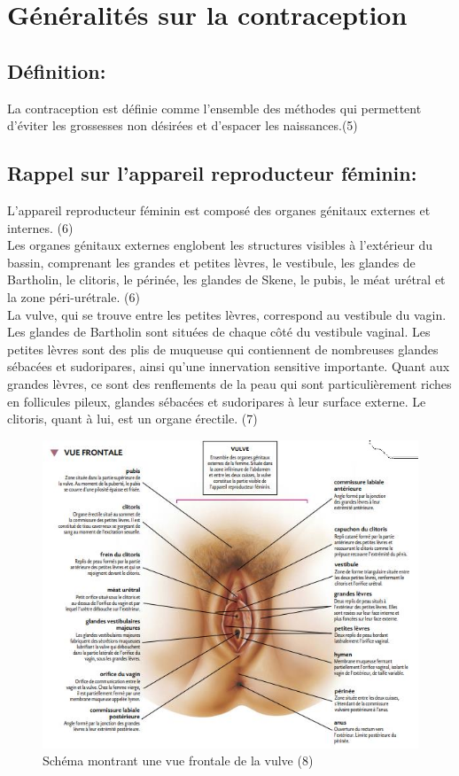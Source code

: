 \section{Généralités sur la contraception}
\subsection{Définition: }
La contraception est définie comme l’ensemble des méthodes qui permettent d’éviter les grossesses non désirées et d’espacer les naissances.(5) \vspace*{1em}

\subsection{Rappel sur l’appareil reproducteur féminin: }
L’appareil reproducteur féminin est composé des organes génitaux externes et internes. (6)\\

\noindent Les organes génitaux externes englobent les structures visibles à l'extérieur du bassin, comprenant les grandes et petites lèvres, le vestibule, les glandes de Bartholin, le clitoris, le périnée, les glandes de Skene, le pubis, le méat urétral et la zone péri-urétrale. (6)\\

\noindent La vulve, qui se trouve entre les petites lèvres, correspond au vestibule du vagin. Les glandes de Bartholin sont situées de chaque côté du vestibule vaginal. Les petites lèvres sont des plis de muqueuse qui contiennent de nombreuses glandes sébacées et sudoripares, ainsi qu'une innervation sensitive importante. Quant aux grandes lèvres, ce sont des renflements de la peau qui sont particulièrement riches en follicules pileux, glandes sébacées et sudoripares à leur surface externe. Le clitoris, quant à lui, est un organe érectile. (7) 

\pagebreak


\begin{figure}[H]
  \centering
  \includegraphics{Images/fig_1.png}
  \caption{Schéma montrant une vue frontale de la vulve (8)}
\end{figure}


